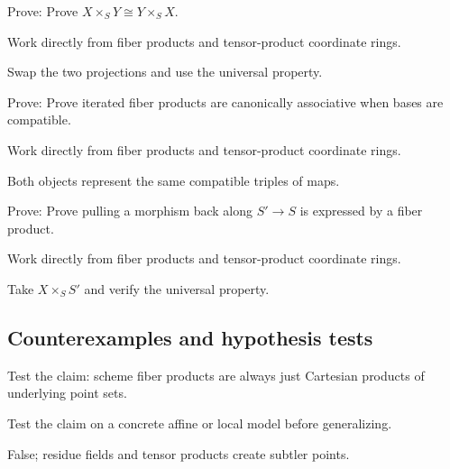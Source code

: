 \begin{exercise}[Symmetry]\label{exr:vi23-expand-07}
Prove: Prove $X\times_S Y\cong Y\times_S X$.
\end{exercise}
\begin{hint}
Work directly from fiber products and tensor-product coordinate rings.
\end{hint}
\begin{solution}
Swap the two projections and use the universal property.
\end{solution}

\begin{exercise}[Associativity]\label{exr:vi23-expand-08}
Prove: Prove iterated fiber products are canonically associative when bases are compatible.
\end{exercise}
\begin{hint}
Work directly from fiber products and tensor-product coordinate rings.
\end{hint}
\begin{solution}
Both objects represent the same compatible triples of maps.
\end{solution}

\begin{exercise}\label{exr:vi23-expand-09}
Prove: Prove pulling a morphism back along $S'\to S$ is expressed by a fiber product.
\end{exercise}
\begin{hint}
Work directly from fiber products and tensor-product coordinate rings.
\end{hint}
\begin{solution}
Take $X\times_S S'$ and verify the universal property.
\end{solution}

\subsection*{Counterexamples and hypothesis tests}

\begin{exercise}\label{exr:vi23-expand-10}
Test the claim: scheme fiber products are always just Cartesian products of underlying point sets.
\end{exercise}
\begin{hint}
Test the claim on a concrete affine or local model before generalizing.
\end{hint}
\begin{solution}
False; residue fields and tensor products create subtler points.
\end{solution}


